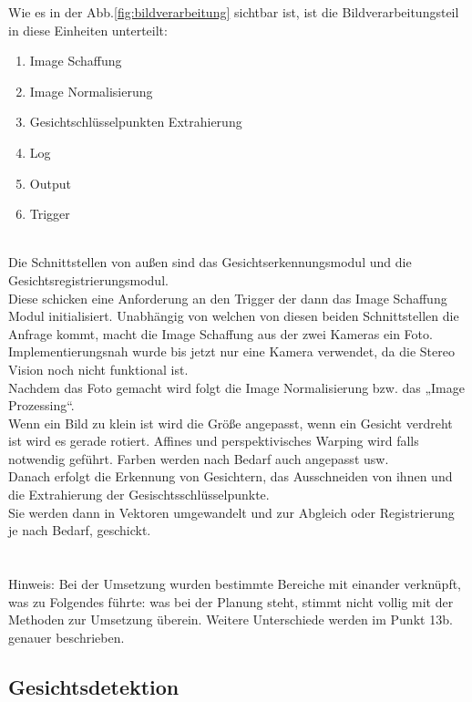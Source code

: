 Wie es in der Abb.\ref{fig:bildverarbeitung} sichtbar ist, ist die Bildverarbeitungsteil in diese Einheiten unterteilt:
\begin{enumerate}
	\item Image Schaffung
	\item Image Normalisierung
	\item Gesichtschlüsselpunkten Extrahierung
	\item Log
	\item Output 
	\item Trigger \\ \\
	
\end{enumerate}
Die Schnittstellen von außen sind das Gesichtserkennungsmodul und die Gesichtsregistrierungsmodul. \\ 
Diese schicken eine Anforderung an den Trigger der dann das Image Schaffung Modul initialisiert. Unabhängig von welchen von diesen beiden Schnittstellen die Anfrage kommt, macht die Image Schaffung aus der zwei Kameras ein Foto. 
\\
Implementierungsnah wurde bis jetzt nur eine Kamera verwendet, da die Stereo Vision noch nicht funktional ist. \\
Nachdem das Foto gemacht wird folgt die Image Normalisierung bzw. das „Image Prozessing“. \\
Wenn ein Bild zu klein ist wird die Größe angepasst, wenn ein Gesicht verdreht ist wird es gerade rotiert. Affines und perspektivisches Warping wird falls notwendig geführt. Farben werden nach Bedarf auch angepasst usw. \\
Danach erfolgt die Erkennung von Gesichtern, das Ausschneiden von ihnen und die Extrahierung der Gesischtsschlüsselpunkte.\\ Sie werden dann in Vektoren umgewandelt und zur Abgleich oder Registrierung je nach Bedarf, geschickt. \\
\\
\\
Hinweis: Bei der Umsetzung wurden bestimmte Bereiche mit einander verknüpft, was zu Folgendes führte: was bei der Planung steht, stimmt nicht vollig mit der Methoden zur Umsetzung überein. Weitere Unterschiede werden im Punkt 13b. genauer beschrieben.  \\

\subsection{Gesichtsdetektion}

